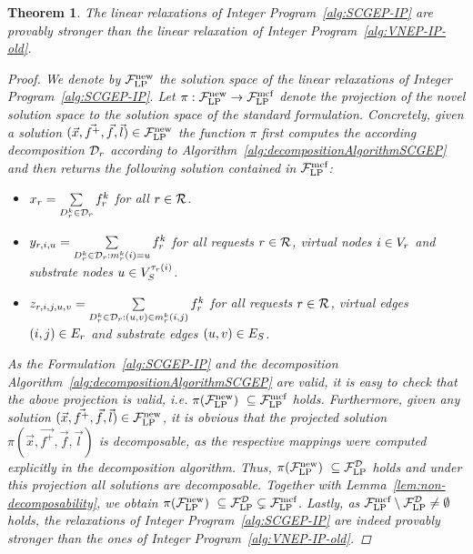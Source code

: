 \documentclass[10pt, conference, letterpaper]{IEEEtran}
\newtheorem{theorem}{Theorem}
\begin{document}
\begin{theorem}
\label{thm:stronger-formulation}
The linear relaxations of Integer Program~\ref{alg:SCGEP-IP} are provably stronger than the linear relaxation of Integer Program~\ref{alg:VNEP-IP-old}.
\begin{proof}
We denote by $\spaceLPNew$ the solution space of the linear relaxations of Integer Program~\ref{alg:SCGEP-IP}. Let $\pi : \spaceLPNew \to \spaceLP$ denote the projection of the novel solution space to the solution space of the standard formulation. Concretely, given a solution $(\vec{x},\vec{f^+},\vec{f},\vec{l}) \in  \spaceLPNew$ the function $\pi$ first computes the according decomposition $\PotEmbeddings$ according to Algorithm~\ref{alg:decompositionAlgorithmSCGEP} and then returns the following solution contained in $\spaceLP$:
\begin{itemize}
\item $x_\req = \sum \limits_{\decomp \in \PotEmbeddings} \prob$ for all $\req \in \requests$. \\[2pt]
\item $y_{\req,i,u} = \sum \limits_{\decomp \in \PotEmbeddings: \mapping(i)=u} \prob$ for all requests $\req \in \requests$, virtual nodes $i\in \VV$ and substrate nodes $u \in \SVTypes[\Vtype(i)]$. \\[2pt]
\item $z_{\req,i,j,u,v} = \sum \limits_{\decomp \in \PotEmbeddings: (u,v) \in  \mapping(i,j)} \prob$ for all requests $\req \in \requests$, virtual edges $(i,j)\in \VE$ and substrate edges $(u,v) \in  \SE$.
\end{itemize}
As the Formulation~\ref{alg:SCGEP-IP} and the decomposition Algorithm~\ref{alg:decompositionAlgorithmSCGEP} are valid, it is easy to check that the above projection is valid, i.e. $\pi(\spaceLPNew)~\subseteq \spaceLP$ holds.
Furthermore, given any solution $(\vec{x},\vec{f^+},\vec{f},\vec{l}) \in  \spaceLPNew$, it is obvious that the projected solution $\pi(\vec{x},\vec{f^+},\vec{f},\vec{l})$ is decomposable, as the respective mappings were computed explicitly in the decomposition algorithm. Thus, $\pi(\spaceLPNew)~\subseteq \spaceLPD$ holds and under this projection all solutions are decomposable. Together with Lemma~\ref{lem:non-decomposability}, we obtain $\pi(\spaceLPNew)~\subseteq \spaceLPD \subsetneq \spaceLP$.
Lastly, as $\spaceLP \setminus \spaceLPD \neq \emptyset$ holds, the relaxations of Integer Program~\ref{alg:SCGEP-IP} are indeed provably stronger than the ones of Integer Program~\ref{alg:VNEP-IP-old}.
\end{proof}
\end{theorem}
\end{document}
